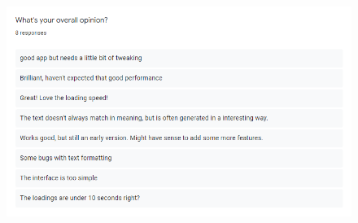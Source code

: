 \documentclass[12pt]{report}
\begin{document}
\begin{appendices}
\begin{figure}[ht]
  \label{fig:feedback3}
\end{figure}
\begin{figure}[ht]
  \centering
  \includegraphics[width=.8\linewidth]{img/feedback4.png}
  \label{fig:feedback4}
\end{figure}

\end{appendices}

\end{document}
